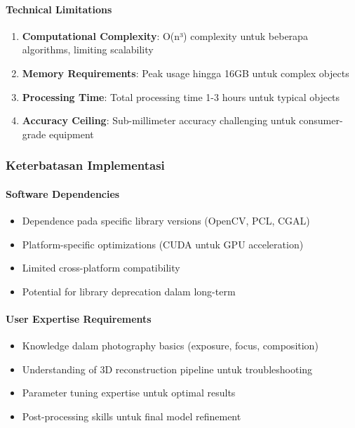 \documentclass[12pt,a4paper]{article}
\begin{document}
\paragraph{Technical Limitations}
\begin{enumerate}
    \item \textbf{Computational Complexity}: O(n³) complexity untuk beberapa algorithms, limiting scalability
    \item \textbf{Memory Requirements}: Peak usage hingga 16GB untuk complex objects
    \item \textbf{Processing Time}: Total processing time 1-3 hours untuk typical objects
    \item \textbf{Accuracy Ceiling}: Sub-millimeter accuracy challenging untuk consumer-grade equipment
\end{enumerate}

\subsubsection{Keterbatasan Implementasi}

\paragraph{Software Dependencies}
\begin{itemize}
    \item Dependence pada specific library versions (OpenCV, PCL, CGAL)
    \item Platform-specific optimizations (CUDA untuk GPU acceleration)
    \item Limited cross-platform compatibility
    \item Potential for library deprecation dalam long-term
\end{itemize}

\paragraph{User Expertise Requirements}
\begin{itemize}
    \item Knowledge dalam photography basics (exposure, focus, composition)
    \item Understanding of 3D reconstruction pipeline untuk troubleshooting
    \item Parameter tuning expertise untuk optimal results
    \item Post-processing skills untuk final model refinement
\end{itemize}
\end{document}
